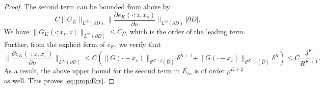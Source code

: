 \begin{proof}
The second term can be bounded from above by
\begin{equation*}
C \|G_K\|_{L^\infty(\partial D)} \|\frac{\partial e_K(\cdot;
z, x_s)}{\partial \nu}\|_{L^\infty(\partial D)} |\partial D|.
\end{equation*}
We have $\|G_K(\cdot; x_r, z)\|_{L^\infty(\partial D)} \le
C\rho$, which is the order of the leading term. Further, from the
explicit form of $e_K$, we verify that
\begin{equation*}
\|\frac{\partial e_K(\cdot; z, x_s)}{\partial
\nu}\|_{L^\infty(\partial D)} \le C \left( \|G(\cdot -
x_s)\|_{\mathcal{C}^{K+2}(\overline{D})} \delta^{K+1} +
\|G(\cdot - x_s)\|_{\mathcal{C}^{K+1}(\overline{D})} \delta^K
\right) \le C\frac{\delta^K}{R^{K+1}}.
\end{equation*}
 As
a result, the above upper bound for the second term in $E_{rs}$ is
of order $\rho^{K+2}$ as well. This proves \eqref{eq:prop:Ers}.
\end{proof}

